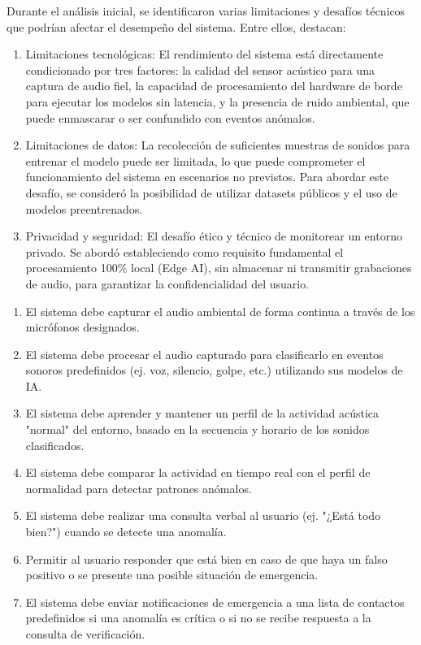 
Durante el análisis inicial, se identificaron varias limitaciones y desafíos técnicos que podrían afectar el desempeño del sistema. Entre ellos, destacan:

\begin{enumerate}
  \item Limitaciones tecnológicas: El rendimiento del sistema está directamente condicionado por tres factores: la calidad del sensor acústico para una captura de audio fiel, la capacidad de procesamiento del hardware de borde para ejecutar los modelos sin latencia, y la presencia de ruido ambiental, que puede enmascarar o ser confundido con eventos anómalos.
  \item Limitaciones de datos: La recolección de suficientes muestras de sonidos para entrenar el modelo puede ser limitada, lo que puede comprometer el funcionamiento del sistema en escenarios no previstos. Para abordar este desafío, se consideró la posibilidad de utilizar datasets públicos y el uso de modelos preentrenados.
  \item Privacidad y seguridad: El desafío ético y técnico de monitorear un entorno privado. Se abordó estableciendo como requisito fundamental el procesamiento 100\% local (Edge AI), sin almacenar ni transmitir grabaciones de audio, para garantizar la confidencialidad del usuario.
\end{enumerate}


\begin{enumerate}
  \item El sistema debe capturar el audio ambiental de forma continua a través de los micrófonos designados.
  \item El sistema debe procesar el audio capturado para clasificarlo en eventos sonoros predefinidos (ej. voz, silencio, golpe, etc.) utilizando sus modelos de IA.
  \item El sistema debe aprender y mantener un perfil de la actividad acústica "normal" del entorno, basado en la secuencia y horario de los sonidos clasificados.
  \item El sistema debe comparar la actividad en tiempo real con el perfil de normalidad para detectar patrones anómalos.
  \item El sistema debe realizar una consulta verbal al usuario (ej. "¿Está todo bien?") cuando se detecte una anomalía.
  \item Permitir al usuario responder que está bien en caso de que haya un falso positivo o se presente una posible situación de emergencia.
  \item El sistema debe enviar notificaciones de emergencia a una lista de contactos predefinidos si una anomalía es crítica o si no se recibe respuesta a la consulta de verificación.
\end{enumerate}

